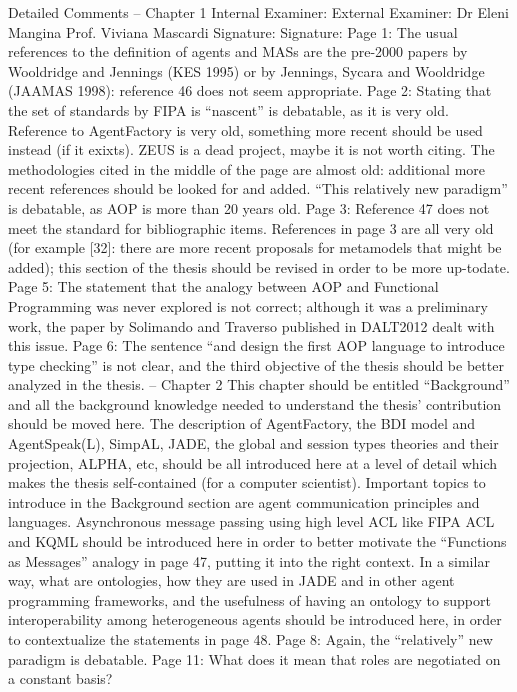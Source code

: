 \documentclass{article}
\newenvironment{them}{\noindent\begingroup\color{blue}}{\endgroup\par}
\begin{document}
\begin{them}
Detailed Comments
-- Chapter 1
Internal Examiner: External Examiner:
Dr Eleni Mangina Prof. Viviana Mascardi
Signature: Signature:
Page 1:
The usual references to the definition of agents and MASs are the pre-2000 papers by Wooldridge
and Jennings (KES 1995) or by Jennings, Sycara and Wooldridge (JAAMAS 1998): reference 46 does
not seem appropriate.
Page 2:
Stating that the set of standards by FIPA is “nascent” is debatable, as it is very old.
Reference to AgentFactory is very old, something more recent should be used instead (if it exixts).
ZEUS is a dead project, maybe it is not worth citing.
The methodologies cited in the middle of the page are almost old: additional more recent references
should be looked for and added.
“This relatively new paradigm” is debatable, as AOP is more than 20 years old.
Page 3:
Reference 47 does not meet the standard for bibliographic items.
References in page 3 are all very old (for example [32]: there are more recent proposals for metamodels
that might be added); this section of the thesis should be revised in order to be more up-todate.
Page 5:
The statement that the analogy between AOP and Functional Programming was never explored is not
correct; although it was a preliminary work, the paper by Solimando and Traverso published in
DALT2012 dealt with this issue.
Page 6:
The sentence “and design the first AOP language to introduce type checking” is not clear, and the
third objective of the thesis should be better analyzed in the thesis.
-- Chapter 2
This chapter should be entitled “Background” and all the background knowledge needed to
understand the thesis' contribution should be moved here. The description of AgentFactory, the BDI
model and AgentSpeak(L), SimpAL, JADE, the global and session types theories and their projection,
ALPHA, etc, should be all introduced here at a level of detail which makes the thesis self-contained
(for a computer scientist).
Important topics to introduce in the Background section are agent communication principles and
languages. Asynchronous message passing using high level ACL like FIPA ACL and KQML should be
introduced here in order to better motivate the “Functions as Messages” analogy in page 47, putting
it into the right context.
In a similar way, what are ontologies, how they are used in JADE and in other agent programming
frameworks, and the usefulness of having an ontology to support interoperability among
heterogeneous agents should be introduced here, in order to contextualize the statements in page
48.
Page 8:
Again, the “relatively” new paradigm is debatable.
Page 11:
What does it mean that roles are negotiated on a constant basis?

\end{them}
\end{document}
